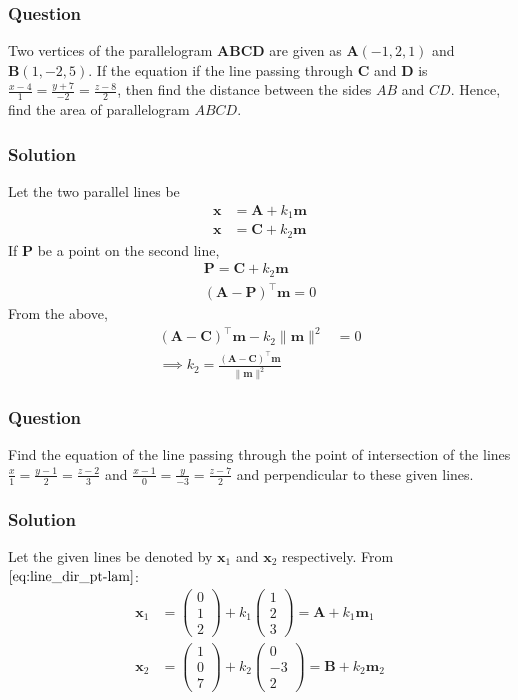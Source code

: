 \documentclass{beamer}
\providecommand{\brak}[1]{\ensuremath{\left(#1\right)}}
\theoremstyle{remark}
\providecommand{\norm}[1]{\lVert#1\rVert}
\newcommand{\myvec}[1]{\ensuremath{\begin{pmatrix}#1\end{pmatrix}}}
\let\vec\mathbf
\begin{document}
\begin{frame}
\frametitle{Question }
Two vertices of the parallelogram $\vec{ABCD}$ are given as $\vec{A}\brak{-1,2,1}$ and $\vec{B}\brak{1,-2,5}$. If the equation if the line passing through $\vec{C}$ and $\vec{D}$ is $\frac{x-4}{1} = \frac{y+7}{-2} = \frac{z-8}{2}$, then find the distance between the sides ${AB}$ and ${CD}$. Hence, find the area of parallelogram ${ABCD}$.
\end{frame}
%
\begin{frame}
\frametitle{Solution}
Let  the two parallel lines be
\begin{align}
    \vec{x} & = \vec{A} + k_1\vec{m}  \\
    \vec{x} &=  \vec{C} + k_2\vec{m} 
\end{align}
If $\vec{P}$ be a point on the second line, 
\begin{align}
    \vec{P} =  \vec{C} + k_2\vec{m} 
    \\
	\brak{\vec{A}-\vec{P}}^{\top}\vec{m} = 0
\end{align}
From the above, 
\begin{align}
	\brak{\vec{A}-\vec{C}}^{\top}\vec{m} -k_2\norm{\vec{m}}^2&= 0
	\\
	\implies k_2 = \frac{
		\brak{\vec{A}-\vec{C}}^{\top}\vec{m}}{ \norm{\vec{m}}^2}
\end{align}
    
\end{frame}
%
\begin{frame}
\frametitle{Question }
Find the equation of the line passing through the point of intersection of the lines $\frac{x}{1} = \frac{y-1}{2} = \frac{z-2}{3}$ and $\frac{x-1}{0} = \frac{y}{-3} = \frac{z-7}{2}$ and perpendicular to these given lines. 
\end{frame}
%
\begin{frame}
\frametitle{Solution}
Let the given lines be denoted by $\vec{x}_1$ and $\vec{x}_2$ respectively. From $\eqref{eq:line_dir_pt-lam}$:
\begin{align}
    \vec{x}_1 &= \myvec{
        0\\
        1\\
        2
    } + k_1\myvec{
        1\\
        2\\
        3
    } = \vec{A} + k_1\vec{m}_1 \label{12} \\
    \vec{x}_2 &= \myvec{
        1\\
        0\\
        7
    } + k_2\myvec{
        0\\
        -3\\
        2
    } = \vec{B} + k_2\vec{m}_2 \label{13}
\end{align}
\end{frame}
\end{document}
